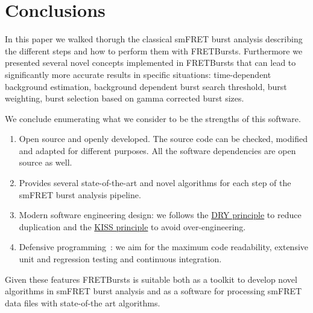 \section{Conclusions}
\label{sec:conclusions}

In this paper we walked thorugh the classical smFRET burst analysis describing
the different steps and how to perform them with FRETBursts.
Furthermore we presented several novel concepts implemented in FRETBursts that 
can lead to significantly more accurate results in specific situations: 
time-dependent background estimation, background dependent burst search threshold,
burst weighting, burst selection based on gamma corrected burst sizes. 

We conclude enumerating what we consider to be the strengths
of this software.

\begin{enumerate}
\item Open source and openly developed. The source code can be checked, modified and
adapted for different purposes. All the software dependencies are open source as well.
\item Provides several state-of-the-art and novel algorithms for each step of the 
smFRET burst analysis pipeline. 
\item Modern software engineering design: we follows the \href{http://en.wikipedia.org/wiki/Don\%27t_repeat_yourself}{DRY principle} to reduce duplication and the \href{http://en.wikipedia.org/wiki/KISS_principle}{KISS principle} to avoid over-engineering.
\item Defensive programming~\cite{Prli__2012}: we aim for the maximum code readability,
extensive unit and regression testing and continuous integration.
\end{enumerate}

Given these features FRETBursts is suitable both as a toolkit to develop novel algorithms
in smFRET burst analysis and as a software for processing smFRET data files with
state-of-the art algorithms.
